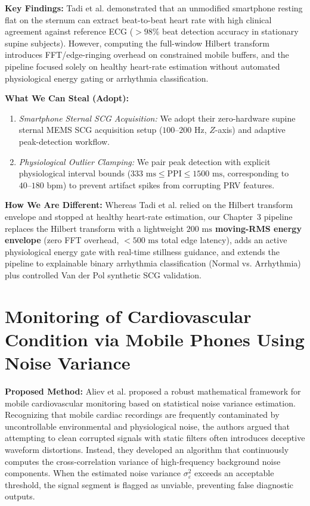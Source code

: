 \textbf{Key Findings:} Tadi et al. demonstrated that an unmodified smartphone resting flat on the sternum can extract beat-to-beat heart rate with high clinical agreement against reference ECG ($>98\%$ beat detection accuracy in stationary supine subjects). However, computing the full-window Hilbert transform introduces FFT/edge-ringing overhead on constrained mobile buffers, and the pipeline focused solely on healthy heart-rate estimation without automated physiological energy gating or arrhythmia classification.

\textbf{What We Can Steal (Adopt):}
\begin{enumerate}
    \item \textit{Smartphone Sternal SCG Acquisition:} We adopt their zero-hardware supine sternal MEMS SCG acquisition setup ($100\text{--}200\text{ Hz}$, $Z$-axis) and adaptive peak-detection workflow.
    \item \textit{Physiological Outlier Clamping:} We pair peak detection with explicit physiological interval bounds ($333\text{ ms} \le \text{PPI} \le 1500\text{ ms}$, corresponding to $40\text{--}180\text{ bpm}$) to prevent artifact spikes from corrupting PRV features.
\end{enumerate}

\textbf{How We Are Different:} Whereas Tadi et al. relied on the Hilbert transform envelope and stopped at healthy heart-rate estimation, our Chapter~3 pipeline replaces the Hilbert transform with a lightweight \textbf{$200\text{ ms}$ moving-RMS energy envelope} (zero FFT overhead, $<500\text{ ms}$ total edge latency), adds an active physiological energy gate with real-time stillness guidance, and extends the pipeline to explainable binary arrhythmia classification (Normal vs. Arrhythmia) plus controlled Van der Pol synthetic SCG validation.

\newpage
\section{Monitoring of Cardiovascular Condition via Mobile Phones Using Noise Variance \cite{aliev2012monitoring}}

\textbf{Proposed Method:} Aliev et al. \cite{aliev2012monitoring} proposed a robust mathematical framework for mobile cardiovascular monitoring based on statistical noise variance estimation. Recognizing that mobile cardiac recordings are frequently contaminated by uncontrollable environmental and physiological noise, the authors argued that attempting to clean corrupted signals with static filters often introduces deceptive waveform distortions. Instead, they developed an algorithm that continuously computes the cross-correlation variance of high-frequency background noise components. When the estimated noise variance $\sigma_{\varepsilon}^2$ exceeds an acceptable threshold, the signal segment is flagged as unviable, preventing false diagnostic outputs.


